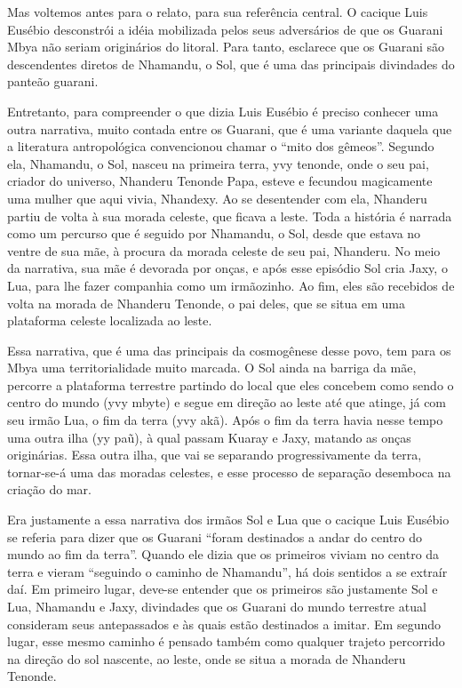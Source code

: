 \documentclass{article}
\begin{document}
Mas voltemos antes para o relato, para sua refer\^encia central. O
cacique Luis Eus\'ebio desconstr\'oi a id\'eia mobilizada pelos seus
advers\'arios de que os Guarani Mbya n\~ao seriam origin\'arios do
litoral. Para tanto, esclarece que os Guarani s\~ao descendentes
diretos de Nhamandu, o Sol, que \'e uma das principais divindades do
pante\~ao guarani. 

Entretanto, para compreender o que dizia Luis Eus\'ebio \'e preciso
conhecer uma outra narrativa, muito contada entre os Guarani, que \'e
uma variante daquela que a literatura antropol\'ogica convencionou
chamar o {\textquotedblleft}mito dos g\^emeos{\textquotedblright}.
Segundo ela, Nhamandu, o Sol, nasceu na primeira terra, yvy tenonde,
onde o seu pai, criador do universo, Nhanderu Tenonde Papa, esteve e
fecundou magicamente uma mulher que aqui vivia, Nhandexy. Ao se
desentender com ela, Nhanderu partiu de volta \`a sua morada celeste,
que ficava a leste. Toda a hist\'oria \'e narrada como um percurso que
\'e seguido por Nhamandu, o Sol, desde que estava no ventre de sua
m\~ae, \`a procura da morada celeste de seu pai, Nhanderu. No meio da
narrativa, sua m\~ae \'e devorada por on\c{c}as, e ap\'os esse
epis\'odio Sol cria Jaxy, o Lua, para lhe fazer companhia como um
irm\~aozinho. Ao fim, eles s\~ao recebidos de volta na morada de
Nhanderu Tenonde, o pai deles, que se situa em uma plataforma celeste
localizada ao leste.

Essa narrativa, que \'e uma das principais da cosmog\^enese desse povo,
tem para os Mbya uma territorialidade muito marcada. O Sol ainda na
barriga da m\~ae, percorre a plataforma terrestre partindo do local que
eles concebem como sendo o centro do mundo (yvy mbyte) e segue em
dire\c{c}\~ao ao leste at\'e que atinge, j\'a com seu irm\~ao Lua, o
fim da terra (yvy ak\~a). Ap\'os o fim da terra havia nesse tempo uma
outra ilha (yy pa\~u), \`a qual passam Kuaray e Jaxy, matando as
on\c{c}as origin\'arias. Essa outra ilha, que vai se separando
progressivamente da terra, tornar-se-\'a uma das moradas celestes, e
esse processo de separa\c{c}\~ao desemboca na cria\c{c}\~ao do mar. 

Era justamente a essa narrativa dos irm\~aos Sol e Lua que o cacique
Luis Eus\'ebio se referia para dizer  que os Guarani
{\textquotedblleft}foram destinados a andar do centro do mundo ao fim
da terra{\textquotedblright}. Quando ele dizia que os primeiros viviam
no centro da terra e vieram {\textquotedblleft}seguindo o caminho de
Nhamandu{\textquotedblright}, h\'a dois sentidos a se extra\'ir da\'i.
Em primeiro lugar, deve-se entender que os primeiros s\~ao justamente
Sol e Lua, Nhamandu e Jaxy, divindades que os Guarani do mundo
terrestre atual consideram seus antepassados e \`as quais est\~ao
destinados a imitar. Em segundo lugar, esse mesmo caminho \'e pensado
tamb\'em como qualquer trajeto percorrido na dire\c{c}\~ao do sol
nascente, ao leste, onde se situa a morada de Nhanderu Tenonde.
\end{document}

